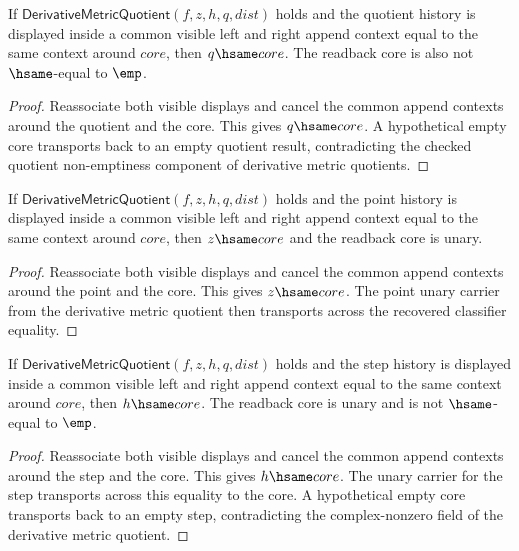 \begin{theorem}
\label{thm:derivative-metric-quotient-quotient-visible-context-readback}
If $\mathsf{DerivativeMetricQuotient}(f,z,h,q,dist)$ holds and the quotient
history is displayed inside a common visible left and right append context
equal to the same context around $core$, then $q\hsame core$. The readback
core is also not $\hsame$-equal to $\emp$.
\end{theorem}
\begin{proof}
Reassociate both visible displays and cancel the common append contexts around
the quotient and the core. This gives $q\hsame core$. A hypothetical empty
core transports back to an empty quotient result, contradicting the checked
quotient non-emptiness component of derivative metric quotients.
\end{proof}

\begin{theorem}
\label{thm:derivative-metric-quotient-point-visible-context-readback}
If $\mathsf{DerivativeMetricQuotient}(f,z,h,q,dist)$ holds and the point
history is displayed inside a common visible left and right append context
equal to the same context around $core$, then $z\hsame core$ and the readback
core is unary.
\end{theorem}
\begin{proof}
Reassociate both visible displays and cancel the common append contexts around
the point and the core. This gives $z\hsame core$. The point unary carrier from
the derivative metric quotient then transports across the recovered classifier
equality.
\end{proof}

\begin{theorem}
\label{thm:derivative-metric-quotient-step-visible-context-readback}
If $\mathsf{DerivativeMetricQuotient}(f,z,h,q,dist)$ holds and the step
history is displayed inside a common visible left and right append context
equal to the same context around $core$, then $h\hsame core$. The readback core
is unary and is not $\hsame$-equal to $\emp$.
\end{theorem}
\begin{proof}
Reassociate both visible displays and cancel the common append contexts around
the step and the core. This gives $h\hsame core$. The unary carrier for the
step transports across this equality to the core. A hypothetical empty core
transports back to an empty step, contradicting the complex-nonzero field of
the derivative metric quotient.
\end{proof}

